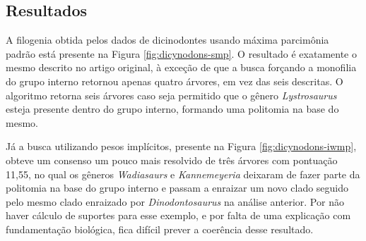 \documentclass[12pt]{article}
\begin{document}
\subsection{Resultados}

A filogenia obtida pelos dados de dicinodontes usando máxima parcimônia padrão está presente na Figura \ref{fig:dicynodons-smp}. O resultado é exatamente o mesmo descrito no artigo original, à exceção de que a busca forçando a monofilia do grupo interno retornou apenas quatro árvores, em vez das seis descritas. O algoritmo retorna seis árvores caso seja permitido que o gênero \emph{Lystrosaurus} esteja presente dentro do grupo interno, formando uma politomia na base do mesmo.

Já a busca utilizando pesos implícitos, presente na Figura \ref{fig:dicynodons-iwmp}, obteve um consenso um pouco mais resolvido de três árvores com pontuação 11,55, no qual os gêneros \emph{Wadiasaurs} e \emph{Kannemeyeria} deixaram de fazer parte da politomia na base do grupo interno e passam a enraizar um novo clado seguido pelo mesmo clado enraizado por \emph{Dinodontosaurus} na análise anterior. Por não haver cálculo de suportes para esse exemplo, e por falta de uma explicação com fundamentação biológica, fica difícil prever a coerência desse resultado.
\end{document}
